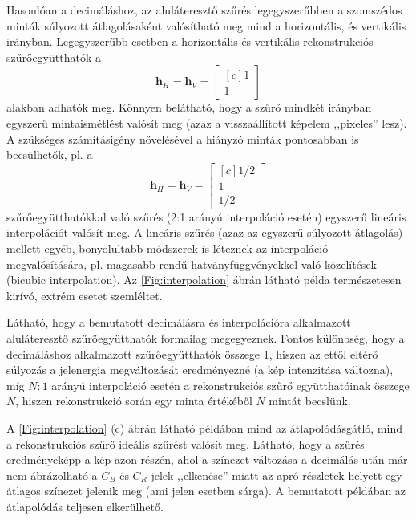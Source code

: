 Hasonlóan a decimáláshoz, az aluláteresztő szűrés legegyszerűbben a szomszédos minták súlyozott átlagolásaként valósítható meg mind a horizontális, és vertikális irányban. 
Legegyszerűbb esetben a horizontális és vertikális rekonstrukciós szűrőegyütthatók a
\begin{equation}
\mathbf{h}_H =
\mathbf{h}_V =
\begin{bmatrix}[c]
       1 \\[0.3em]
       1\end{bmatrix}
\end{equation}
alakban adhatók meg.
Könnyen belátható, hogy a szűrő mindkét irányban egyszerű mintaismétlést valósít meg (azaz a visszaállított képelem ,,pixeles'' lesz).
A szükséges számításigény növelésével a hiányzó minták pontosabban is becsülhetők, pl. a 
\begin{equation}
\mathbf{h}_H =
\mathbf{h}_V =
\begin{bmatrix}[c]
       1/2 \\[0.3em]
       1 \\[0.3em]
       1/2 \end{bmatrix}
\end{equation}
szűrőegyütthatókkal való szűrés (2:1 arányú interpoláció esetén) egyszerű lineáris interpolációt valósít meg.
A lineáris szűrés (azaz az egyszerű súlyozott átlagolás) mellett egyéb, bonyolultabb módszerek is léteznek az interpoláció megvalósítására, pl. magasabb rendű hatványfüggvényekkel való közelítések (bicubic interpolation).
Az \ref{Fig:interpolation} ábrán látható példa természetesen kirívó, extrém esetet szemléltet.

Látható, hogy a bemutatott decimálásra és interpolációra alkalmazott aluláteresztő szűrőegyütthatók formailag megegyeznek.
Fontos különbség, hogy a decimáláshoz alkalmazott szűrőegyütthatók összege 1, hiszen az ettől eltérő súlyozás a jelenergia megváltozását eredményezné (a kép intenzitása változna), míg $N:1$ arányú interpoláció esetén a rekonstrukciós szűrő együtthatóinak összege $N$, hiszen rekonstrukció során egy minta értékéből $N$ mintát becslünk.

A \ref{Fig:interpolation} (c) ábrán látható példában mind az átlapolódásgátló, mind a rekonstrukciós szűrő ideális szűrést valósít meg.
Látható, hogy a szűrés eredményeképp a kép azon részén, ahol a színezet változása a decimálás után már nem ábrázolható a $C_B$ és $C_R$ jelek ,,elkenése'' miatt az apró részletek helyett egy átlagos színezet jelenik meg (ami jelen esetben sárga).
A bemutatott példában az átlapolódás teljesen elkerülhető.

